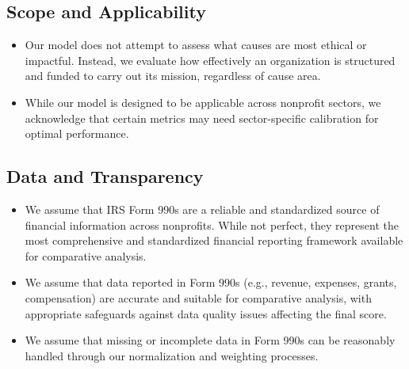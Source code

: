 \documentclass[12pt]{article}
\begin{document}
\subsection*{Scope and Applicability}
\begin{itemize}
    \item Our model does not attempt to assess what causes are most ethical or impactful. Instead, we evaluate how effectively an organization is structured and funded to carry out its mission, regardless of cause area.
    
    \item While our model is designed to be applicable across nonprofit sectors, we acknowledge that certain metrics may need sector-specific calibration for optimal performance.
\end{itemize}

\subsection*{Data and Transparency}
\begin{itemize}
    \item We assume that IRS Form 990s are a reliable and standardized source of financial information across nonprofits. While not perfect, they represent the most comprehensive and standardized financial reporting framework available for comparative analysis.
    
    \item We assume that data reported in Form 990s (e.g., revenue, expenses, grants, compensation) are accurate and suitable for comparative analysis, with appropriate safeguards against data quality issues affecting the final score.
    
    \item We assume that missing or incomplete data in Form 990s can be reasonably handled through our normalization and weighting processes.
\end{itemize}
\end{document}
